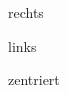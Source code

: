 \begin{flushright}
    rechts
\end{flushright}
\begin{flushleft}
    links
\end{flushleft}
\begin{center}
    zentriert
\end{center}
